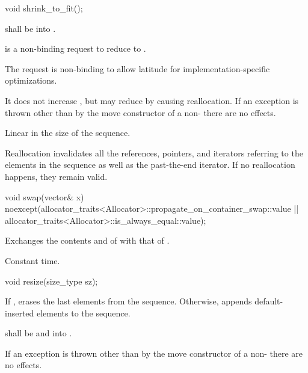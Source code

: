 %
\begin{itemdecl}
void shrink_to_fit();
\end{itemdecl}

\begin{itemdescr}
\pnum
\requires {} shall be  into .

\pnum
\effects {} is a non-binding request to reduce
 to .
\begin{note} The request is non-binding to allow latitude for
implementation-specific optimizations. \end{note}
It does not increase , but may reduce 
by causing reallocation.
If an exception is thrown other than by the move constructor
of a non-  there are no effects.

\pnum
\complexity Linear in the size of the sequence.

\pnum
\remarks Reallocation invalidates all the references, pointers, and iterators
referring to the elements in the sequence as well as the past-the-end iterator.
If no reallocation happens, they remain valid.
\end{itemdescr}

%
\begin{itemdecl}
void swap(vector& x)
  noexcept(allocator_traits<Allocator>::propagate_on_container_swap::value ||
           allocator_traits<Allocator>::is_always_equal::value);
\end{itemdecl}

\begin{itemdescr}
\pnum
\effects
Exchanges the contents and
of
with that of .

\pnum
\complexity
Constant time.
\end{itemdescr}

%
\begin{itemdecl}
void resize(size_type sz);
\end{itemdecl}

\begin{itemdescr}
\pnum
\effects If , erases the last  elements
from the sequence. Otherwise,
appends  default-inserted elements to the sequence.

\pnum
\requires {} shall be
 and  into .

\pnum
\remarks If an exception is thrown other than by the move constructor of a non-
 there are no effects.
\end{itemdescr}

